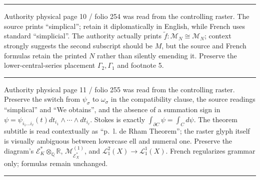 \documentclass[
  english,
  a3paper,
  a3paper]{extarticle}
\begin{document}
\par

\vspace{0.7mm}\hrule\vspace{1.6mm}

\fontsize{11}{14}\selectfont

Authority physical page 10 / folio 254 was read from the controlling
raster. The source prints ``simplical''; retain it diplomatically in
English, while French uses standard ``simplicial''. The authority
actually prints \(\tilde f:\mathcal M_N\cong\mathcal M_N\); context
strongly suggests the second subscript should be \(M\), but the source
and French formulas retain the printed \(N\) rather than silently
emending it. Preserve the lower-central-series placement
\(\Gamma_2,\Gamma_1\) and footnote 5.

\clearpage



\par

\vspace{0.7mm}\hrule\vspace{1.6mm}

\fontsize{11}{14}\selectfont

Authority physical page 11 / folio 255 was read from the controlling
raster. Preserve the switch from \(\psi_\sigma\) to \(\omega_\sigma\) in
the compatibility clause, the source readings ``simplical'' and ``We
obtains'', and the absence of a summation sign in
\(\psi=\psi_{i_1\ldots i_\ell}(t)dt_{i_1}\wedge\cdots\wedge dt_{i_\ell}\).
Stokes is exactly \(\int_{\partial C}\psi=\int_Cd\psi\). The theorem
subtitle is read contextually as ``p.~l. de Rham Theorem''; the raster
glyph itself is visually ambiguous between lowercase ell and numeral
one. Preserve the diagram's
\(\mathscr E_K^*\otimes_{\mathbb Q}\mathbb R\),
\(\mathcal M_{\mathscr E_X^*}^{(1)}\), and
\(\mathcal L_1^2(X)\to\mathcal L_1^1(X)\). French regularizes grammar
only; formulas remain unchanged.

\clearpage



\par

\vspace{0.7mm}\hrule\vspace{1.6mm}
\end{document}
